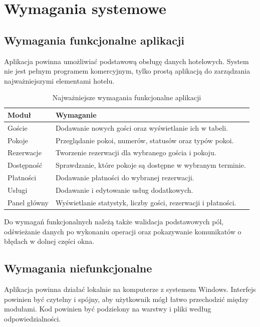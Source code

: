 \chapter{Wymagania systemowe}

\section{Wymagania funkcjonalne aplikacji}

Aplikacja powinna umożliwiać podstawową obsługę danych hotelowych. System nie jest pełnym programem komercyjnym, tylko prostą aplikacją do zarządzania najważniejszymi elementami hotelu.

\begin{table}[H]
\centering
\caption{Najważniejsze wymagania funkcjonalne aplikacji}
\begin{tabular}{|p{3cm}|p{10cm}|}
\hline
\textbf{Moduł} & \textbf{Wymaganie} \\
\hline
Goście & Dodawanie nowych gości oraz wyświetlanie ich w tabeli. \\
\hline
Pokoje & Przeglądanie pokoi, numerów, statusów oraz typów pokoi. \\
\hline
Rezerwacje & Tworzenie rezerwacji dla wybranego gościa i pokoju. \\
\hline
Dostępność & Sprawdzanie, które pokoje są dostępne w wybranym terminie. \\
\hline
Płatności & Dodawanie płatności do wybranej rezerwacji. \\
\hline
Usługi & Dodawanie i edytowanie usług dodatkowych. \\
\hline
Panel główny & Wyświetlanie statystyk, liczby gości, rezerwacji i płatności. \\
\hline
\end{tabular}
\end{table}

Do wymagań funkcjonalnych należą także walidacja podstawowych pól, odświeżanie danych po wykonaniu operacji oraz pokazywanie komunikatów o błędach w dolnej części okna.

\section{Wymagania niefunkcjonalne}

Aplikacja powinna działać lokalnie na komputerze z systemem Windows. Interfejs powinien być czytelny i spójny, aby użytkownik mógł łatwo przechodzić między modułami. Kod powinien być podzielony na warstwy i pliki według odpowiedzialności.

